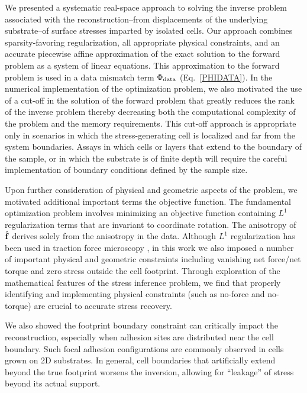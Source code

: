 \documentclass[aps,prl,reprint,groupedaddress,twocolumn]{revtex4-1}
\def\f{{\bf f}}
\newcommand{\remove}{\deleted}
\begin{document}
We presented a systematic real-space approach to solving the inverse
problem associated with the reconstruction--from displacements of the
underlying substrate--of surface stresses imparted by isolated cells.
Our approach combines sparsity-favoring regularization, all
appropriate physical constraints, and an accurate piecewise affine
approximation of the exact solution to the forward problem as a system
of linear equations. This approximation to the forward problem is used
in a data mismatch term $\Phi_{\rm data}$ (Eq.~\ref{PHIDATA}).  In the
numerical implementation of the optimization problem, we also
motivated the use of a cut-off in the solution of the forward problem
that greatly reduces the rank of the inverse problem thereby
decreasing both the computational complexity of the problem and the
memory requirements. This cut-off approach is appropriate only in
scenarios in which the stress-generating cell is localized and far
from the system boundaries. Assays in which cells or layers that
extend to the boundary of the sample, or in which the substrate is of
finite depth will require\remove{d} the careful implementation of boundary
conditions defined by the sample size.

Upon further consideration of physical and geometric aspects of the
problem, we motivated additional important terms the objective
function.  The fundamental optimization problem involves minimizing an
objective function containing $L^{1}$ regularization terms that are
invariant to coordinate rotation. The anisotropy of $\hat{\f}$ derives
solely from the anisotropy in the data. Although $L^{1}$
regularization has been used in traction force microscopy
\cite{DANUSER}, in this work we also imposed a number of important
physical and geometric constraints including vanishing net force/net
torque and zero stress outside the cell footprint. Through exploration
of the mathematical features of the stress inference problem, we find
that properly identifying and implementing physical constraints (such
as no-force and no-torque) are crucial to accurate stress recovery.

We also showed the footprint boundary constraint \remove{is} can
critically impact the reconstruction, especially when adhesion sites
are distributed near the cell boundary. Such
 focal adhesion configurations are commonly
observed in cells grown on 2D substrates. In general,
cell boundaries that artificially extend beyond the true footprint
worsens the inversion, allowing for ``leakage'' of stress beyond its
actual support. 
\end{document}
